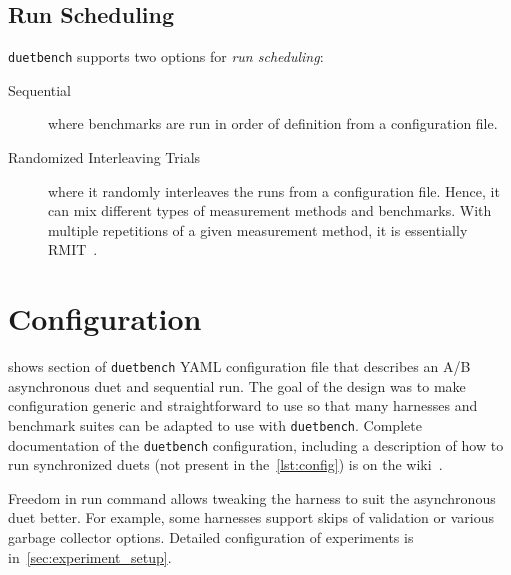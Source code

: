 \subsection{Run Scheduling}
\label{sec:scheduling}

\lstinline{duetbench} supports two options for \emph{run scheduling}:
\begin{description}
    \item[Sequential] where benchmarks are run in order of definition from a configuration file.
    \item[Randomized Interleaving Trials] where it randomly interleaves the runs from a configuration file.
        Hence, it can mix different types of measurement methods and benchmarks.
        With multiple repetitions of a given measurement method, it is essentially RMIT~\cite{abedi2017conducting}.
\end{description}

\section{Configuration}
\label{sec:configuration}

 shows section of \lstinline{duetbench} YAML configuration file that describes an A/B asynchronous duet and sequential run.
The goal of the design was to make configuration generic and straightforward to use so that many harnesses and benchmark suites can be adapted to use with \lstinline{duetbench}.
Complete documentation of the \lstinline{duetbench} configuration, including a description of how to run synchronized duets (not present in the~\cref{lst:config}) is on the wiki~\cite{wiki}.

Freedom in run command allows tweaking the harness to suit the asynchronous duet better.
For example, some harnesses support skips of validation or various garbage collector options.
Detailed configuration of experiments is in~\cref{sec:experiment_setup}.

